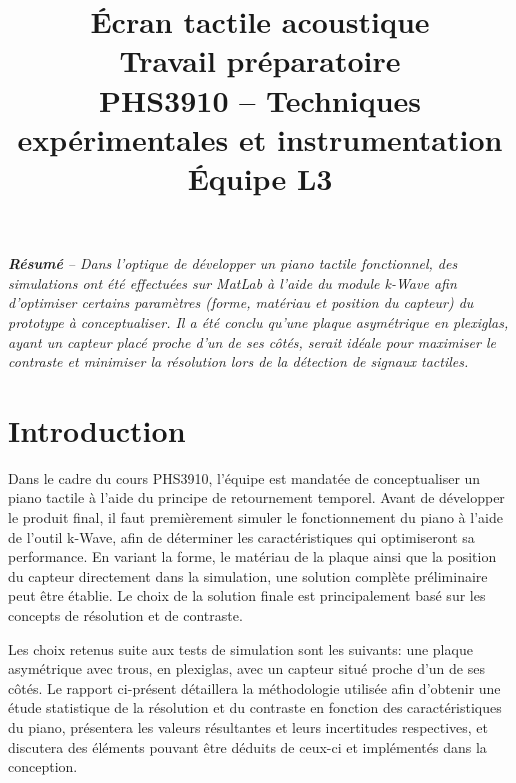 \documentclass[conference]{IEEEtran}
\begin{document}
\title{Écran tactile acoustique\\
\large Travail préparatoire \\
PHS3910 -- Techniques expérimentales et instrumentation\\ 
Équipe L3}

\author{
\and
{}
\and
{}
\and
{}
}

\maketitle

\textit{\textbf{Résumé} -- Dans l'optique de développer un piano tactile fonctionnel,
des simulations ont été effectuées sur MatLab à l'aide du module k-Wave afin d'optimiser
certains paramètres (forme, matériau et position du capteur) du prototype à conceptualiser. 
Il a été conclu qu'une plaque asymétrique en plexiglas, ayant 
un capteur placé proche d'un de ses côtés, serait idéale pour maximiser le contraste et minimiser la résolution 
lors de la détection de signaux tactiles.}

\section{Introduction}
Dans le cadre du cours PHS3910, l'équipe est mandatée de conceptualiser
un piano tactile à l'aide du principe de retournement temporel. Avant
de développer le produit final, il faut premièrement simuler le fonctionnement 
du piano à l'aide de l'outil k-Wave, afin de déterminer les caractéristiques qui 
optimiseront sa performance. En variant la forme, le matériau de 
la plaque ainsi que la position du capteur directement dans la simulation,
une solution complète préliminaire peut être établie. Le choix de la solution finale est
principalement basé sur les concepts de résolution et de contraste.

Les choix retenus suite aux tests de simulation sont les suivants: une plaque
asymétrique avec trous, en plexiglas, avec un capteur situé proche d'un de ses côtés.
Le rapport ci-présent détaillera la méthodologie utilisée afin d'obtenir 
une étude statistique de la résolution et du contraste en fonction des
caractéristiques du piano, présentera les valeurs résultantes et leurs incertitudes 
respectives, et discutera des éléments pouvant être déduits de ceux-ci et implémentés 
dans la conception.
\end{document}
